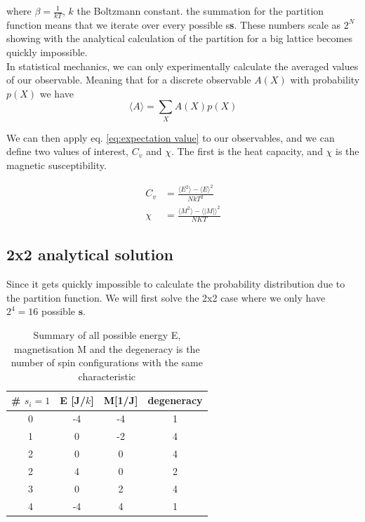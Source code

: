 \documentclass[english,notitlepage,reprint,nofootinbib]{revtex4-2}  %
\begin{document}
	where $\beta = \frac{1}{kT}$, $k$ the Boltzmann constant. the summation for the partition
	function means that we iterate over every possible s\textbf{s}. These numbers scale as $2^N$
	showing with the analytical calculation of the partition for a big lattice becomes quickly
	impossible. \\

	In statistical mechanics, we can only experimentally calculate the averaged values of our
	observable. Meaning that for a discrete observable $A(X)$ with probability $p(X)$ we have
	\begin{equation}
		\langle A \rangle = \sum_{X}A(X)p(X) \label{eq:expectation value}
	\end{equation}

	We can then apply eq. \ref{eq:expectation value} to our observables, and we can define two
	values of interest, $C_v$ and $\chi$. The first is the heat capacity, and $\chi$ is the
	magnetic susceptibility.

	\begin{align}
		C_v &= \frac{\langle E^2 \rangle - \langle E \rangle^2}{NkT^2} \label{eq:heat_capacity} \\
		\chi &= \frac{\langle M^2 \rangle - \langle |M| \rangle^2}{NKT} \label{eq:susceptibility}
	\end{align}

	\subsection{2x2 analytical solution}\label{subsec:analytical solution}

	Since it gets quickly impossible to calculate the probability distribution due to the
	partition function. We will first solve the 2x2 case where we only have $2^4=16$ possible
	$\textbf{s}$.

	\begin{table}[h!]
	\centering
	\begin{tabular}{|c|c|c|c|}
		\hline
		\# $s_i=1$ & E [J/$k$] & M[1/J] & degeneracy \\
		\hline
		\hline
		0 & -4 &  -4 &  1  \\
		1 & 0&   -2&   4  \\
		2 & 0 & 0&  4  \\
		2 & 4 & 0 &  2 \\
		3 & 0  & 2 & 4 \\
		4 & -4 & 4 & 1 \\
		\hline
	\end{tabular}
	\caption{ Summary of all possible energy E, magnetisation M and the degeneracy is the
	number of spin configurations with the same characteristic} \label{tab:summary2x2}
	\end{table}
\end{document}

